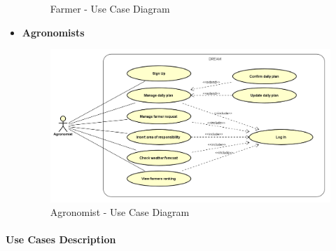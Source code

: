 \documentclass[table, 12pt]{article}
\begin{document}
\begin{itemize}
\begin{center}
\begin{figure}[H]
            \caption{Farmer - Use Case Diagram}
            \label{fig: UseCase_Farmer}
        \end{figure}
    \end{center}
    \newpage
    \item \textbf {Agronomists}
    \begin{center}
        \begin{figure}[H]
            \includegraphics[scale=0.60, center]{assets/Use cases/UseCase_Agronomist.png}
            \caption{Agronomist - Use Case Diagram}
            \label{fig: UseCase_Agronomist}
        \end{figure}
    \end{center}
    \newpage
\end{itemize}

    \paragraph{Use Cases Description}
    
\end{document}
